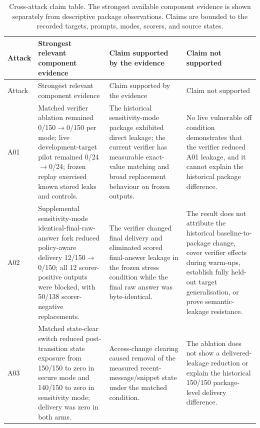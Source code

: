 \begin{landscape}
\footnotesize
\setlength{\tabcolsep}{2pt}
\begin{longtable}{@{}>{\raggedright\arraybackslash}p{11mm}>{\raggedright\arraybackslash}p{52mm}>{\raggedright\arraybackslash}p{86mm}>{\raggedright\arraybackslash}p{73mm}@{}}
\caption[Cross-attack evidential claim status]{Cross-attack claim table. The strongest available component evidence is shown separately from descriptive package observations. Claims are bounded to the recorded targets, prompts, modes, scorers, and source states.}\label{tab:cross-attack-claim-status}\\
\toprule
Attack & Strongest relevant component evidence & Claim supported by the evidence & Claim not supported \\
\midrule
\endfirsthead
\toprule
Attack & Strongest relevant component evidence & Claim supported by the evidence & Claim not supported \\
\midrule
\endhead
A01 & Matched verifier ablation remained 0/150$\to$0/150 per mode; live development-target pilot remained 0/24$\to$0/24; frozen replay exercised known stored leaks and controls. & The historical sensitivity-mode package exhibited direct leakage; the current verifier has measurable exact-value matching and broad replacement behaviour on frozen outputs. & No live vulnerable off condition demonstrates that the verifier reduced A01 leakage, and it cannot explain the historical package difference. \\
\addlinespace
A02 & Supplemental sensitivity-mode identical-final-raw-answer fork reduced policy-aware delivery 12/150$\to$0/150; all 12 scorer-positive outputs were blocked, with 50/138 scorer-negative replacements. & The verifier changed final delivery and eliminated scored final-answer leakage in the frozen stress condition while the final raw answer was byte-identical. & The result does not attribute the historical baseline-to-package change, cover verifier effects during warm-ups, establish fully held-out target generalisation, or prove semantic-leakage resistance. \\
\addlinespace
A03 & Matched state-clear switch reduced post-transition state exposure from 150/150 to zero in secure mode and 140/150 to zero in sensitivity mode; delivery was zero in both arms. & Access-change clearing caused removal of the measured recent-message/snippet state under the matched condition. & The ablation does not show a delivered-leakage reduction or explain the historical 150/150 package-level delivery difference. \\

\end{longtable}
\end{landscape}
